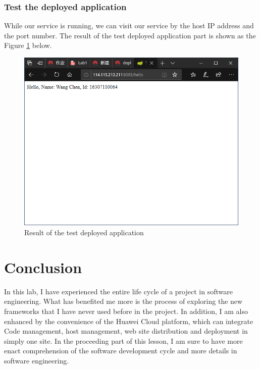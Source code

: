 \documentclass[a4paper]{report}
\begin{document}
\subsection{Test the deployed application}
While our service is running, we can visit our service by the host IP address and the port number. The result of the test deployed application part is shown as the Figure \ref{14} below.
\begin{figure}
  \centering
  \includegraphics[width=12cm]{Figures/Capture11.png}
  \caption{Result of the test deployed application}\label{14}
\end{figure}
\chapter{Conclusion}
In this lab, I have experienced the entire life cycle of a project in software engineering. What has benefited me more is the process of exploring the new frameworks that I have never used before in the project. In addition, I am also enhanced by the convenience of the Huawei Cloud platform, which can integrate Code management, host management, web site distribution and deployment in simply one site. In the proceeding part of this lesson, I am sure to have more enact comprehension of the software development cycle and more details in software engineering.
\end{document}
